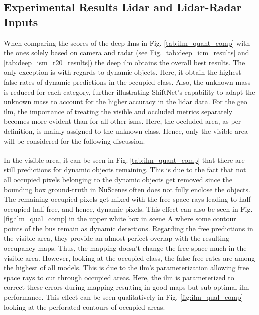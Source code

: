 \subsection{Experimental Results Lidar and Lidar-Radar Inputs}
\label{subsec:exp_lidar_fusion_in_deep_isms}
When comparing the scores of the deep \gls{ilm}s in Fig. \ref{tab:ilm_quant_comp} with the ones solely based on camera and radar (see Fig. \ref{tab:deep_icm_results} and \ref{tab:deep_ism_r20_results}) the deep \gls{ilm} obtains the overall best results. The only exception is with regards to dynamic objects. Here, it obtain the highest false rates of dynamic predictions in the occupied class. Also, the unknown mass is reduced for each category, further illustrating ShiftNet's capability to adapt the unknown mass to account for the higher accuracy in the lidar data. For the geo \gls{ilm}, the importance of treating the visible and occluded metrics separately becomes more evident than for all other \gls{ism}s. Here, the occluded area, as per definition, is mainly assigned to the unknown class. Hence, only the visible area will be considered for the following discussion.
\\\\
In the visible area, it can be seen in Fig. \ref{tab:ilm_quant_comp} that there are still predictions for dynamic objects remaining. This is due to the fact that not all occupied pixels belonging to the dynamic objects get removed since the bounding box ground-truth in NuScenes often does not fully enclose the objects. The remaining occupied pixels get mixed with the free space rays leading to half occupied half free, and hence, dynamic pixels. This effect can also be seen in Fig. \ref{fig:ilm_qual_comp} in the upper white box in scene A where some contour points of the bus remain as dynamic detections. Regarding the free predictions in the visible area, they provide an almost perfect overlap with the resulting occupancy maps. Thus, the mapping doesn't change the free space much in the visible area. However, looking at the occupied class, the false free rates are among the highest of all models. This is due to the \gls{ilm}'s parameterization allowing free space rays to cut through occupied areas. Here, the \gls{ilm} is parameterized to correct these errors during mapping resulting in good maps but sub-optimal \gls{ilm} performance. This effect can be seen qualitatively in Fig. \ref{fig:ilm_qual_comp} looking at the perforated contours of occupied areas.
\\\\
